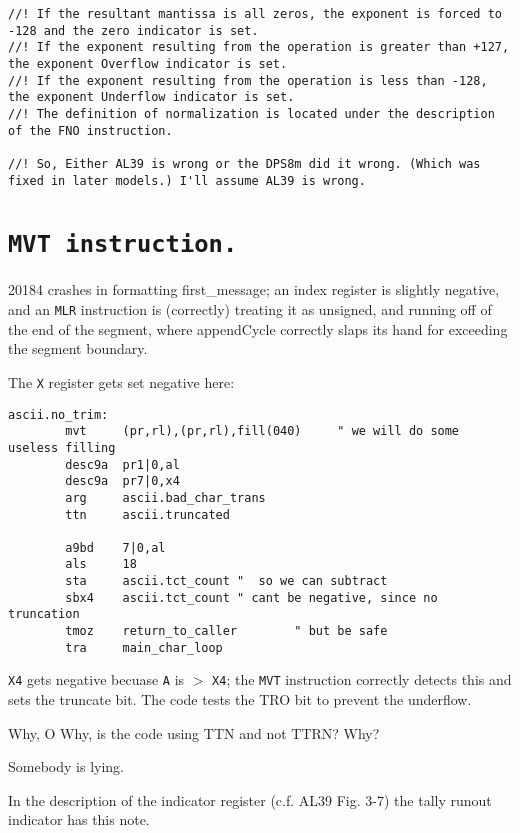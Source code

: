 \documentclass[notitlepage]{report}
\begin{document}
\begin{verbatim}
//! If the resultant mantissa is all zeros, the exponent is forced to -128 and the zero indicator is set.
//! If the exponent resulting from the operation is greater than +127, the exponent Overflow indicator is set.
//! If the exponent resulting from the operation is less than -128, the exponent Underflow indicator is set.
//! The definition of normalization is located under the description of the FNO instruction.

//! So, Either AL39 is wrong or the DPS8m did it wrong. (Which was fixed in later models.) I'll assume AL39 is wrong.

\end{verbatim}



\section{\texttt{MVT instruction.}}

20184 crashes in formatting first\_message; an index register is
slightly negative, and an \texttt{MLR} instruction is (correctly) treating it
as unsigned, and running off of the end of the segment, where
appendCycle correctly slaps its hand for exceeding the segment
boundary.

The \texttt{X} register gets set negative here:

\begin{verbatim}
ascii.no_trim:
        mvt     (pr,rl),(pr,rl),fill(040)     " we will do some useless filling
        desc9a  pr1|0,al
        desc9a  pr7|0,x4
        arg     ascii.bad_char_trans
        ttn     ascii.truncated

        a9bd    7|0,al
        als     18
        sta     ascii.tct_count "  so we can subtract
        sbx4    ascii.tct_count " cant be negative, since no truncation
        tmoz    return_to_caller        " but be safe
        tra     main_char_loop
\end{verbatim}

\texttt{X4} gets negative becuase \texttt{A} is $>$ \texttt{X4}; the \texttt{MVT} 
instruction correctly detects this
and sets the truncate bit. The code tests the TRO bit to prevent the
underflow.

Why, O Why, is the code using TTN and not TTRN? Why?

Somebody is lying.


In the description of the indicator register (c.f. AL39 Fig. 3-7) the tally runout indicator has this note. 
\end{document}
